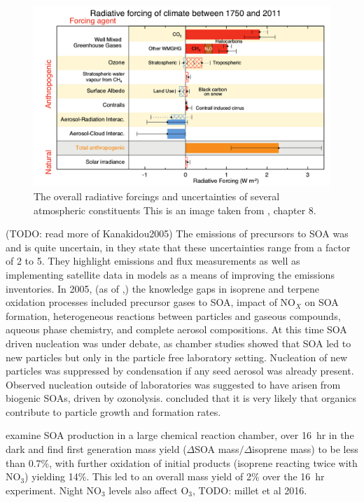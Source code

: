     \begin{figure}
      \includegraphics[width=\textwidth]{Figures/IPCC_WG1AR5_RFSummary.png}
      \caption{%
        The overall radiative forcings and uncertainties of several atmospheric constituents
        This is an image taken from \cite{IPCC_AR5_WG1}, chapter 8.}
      \label{LR:VOCs:IsopCascade:SOA:fig_IPCC_RF_AR5}
    \end{figure}    
    
    (TODO: read more of Kanakidou2005)
    The emissions of precursors to SOA was and is quite uncertain, in \cite{Kanakidou2005} they state that these uncertainties range from a factor of 2 to 5.
    They highlight emissions and flux measurements as well as implementing satellite data in models as a means of improving the emissions inventories.
    In 2005, (as of \cite{Kanakidou2005},) the knowledge gaps in isoprene and terpene oxidation processes included precursor gases to SOA, impact of NO$_X$ on SOA formation, heterogeneous reactions between particles and gaseous compounds, aqueous phase chemistry, and complete aerosol compositions.
    At this time SOA driven nucleation was under debate, as chamber studies showed that SOA led to new particles but only in the particle free laboratory setting. 
    Nucleation of new particles was suppressed by condensation if any seed aerosol was already present.
    Observed nucleation outside of laboratories was suggested to have arisen from biogenic SOAs, driven by ozonolysis.
    \cite{Kanakidou2005} concluded that it is very likely that organics contribute to particle growth and formation rates.
    
    \cite{Rollins2009} examine SOA production in a large chemical reaction chamber, over 16~hr in the dark and find first generation mass yield ($\Delta$SOA mass$/\Delta$isoprene mass) to be less than 0.7\%, with further oxidation of initial products (isoprene reacting twice with NO$_3$) yielding 14\%.
    This led to an overall mass yield of 2\% over the 16~hr experiment.
    Night NO$_3$ levels also affect O$_3$, TODO: millet et al 2016. %
    
